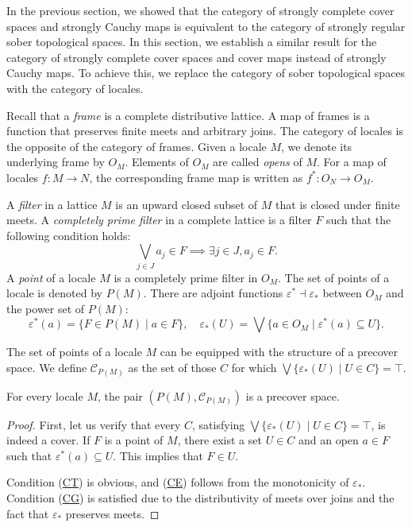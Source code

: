 \documentclass[reqno]{amsart}
\newcommand{\axref}[1]{(\hyperref[ax:#1]{#1})}
\theoremstyle{definition}
\theoremstyle{remark}
\numberwithin{figure}{section}
\begin{document}
In the previous section, we showed that the category of strongly complete cover spaces and strongly Cauchy maps is equivalent to the category of strongly regular sober topological spaces.
In this section, we establish a similar result for the category of strongly complete cover spaces and cover maps instead of strongly Cauchy maps.
To achieve this, we replace the category of sober topological spaces with the category of locales.

Recall that a \emph{frame} is a complete distributive lattice.
A map of frames is a function that preserves finite meets and arbitrary joins.
The category of locales is the opposite of the category of frames.
Given a locale $M$, we denote its underlying frame by $O_M$.
Elements of $O_M$ are called \emph{opens} of $M$.
For a map of locales $f : M \to N$, the corresponding frame map is written as $f^* : O_N \to O_M$.

A \emph{filter} in a lattice $M$ is an upward closed subset of $M$ that is closed under finite meets.
A \emph{completely prime filter} in a complete lattice is a filter $F$ such that the following condition holds:
\[ \bigvee_{j \in J} a_j \in F \implies \exists j \in J, a_j \in F. \]
A \emph{point} of a locale $M$ is a completely prime filter in $O_M$.
The set of points of a locale is denoted by $P(M)$.
There are adjoint functions $\varepsilon^* \dashv \varepsilon_*$ between $O_M$ and the power set of $P(M)$:
\[ \varepsilon^*(a) = \{ F \in P(M) \mid a \in F \}, \quad \varepsilon_*(U) = \bigvee \{ a \in O_M \mid \varepsilon^*(a) \subseteq U \}. \]

The set of points of a locale $M$ can be equipped with the structure of a precover space.
We define $\mathcal{C}_{P(M)}$ as the set of those $C$ for which $\bigvee \{ \varepsilon_*(U) \mid U \in C \} = \top$.

\begin{prop}
For every locale $M$, the pair $(P(M),\mathcal{C}_{P(M)})$ is a precover space.
\end{prop}
\begin{proof}
First, let us verify that every $C$, satisfying $\bigvee \{ \varepsilon_*(U) \mid U \in C \} = \top$, is indeed a cover.
If $F$ is a point of $M$, there exist a set $U \in C$ and an open $a \in F$ such that $\varepsilon^*(a) \subseteq U$.
This implies that $F \in U$.

Condition \axref{CT} is obvious, and \axref{CE} follows from the monotonicity of $\varepsilon_*$.
Condition \axref{CG} is satisfied due to the distributivity of meets over joins and the fact that $\varepsilon_*$ preserves meets.
\end{proof}
\end{document}
